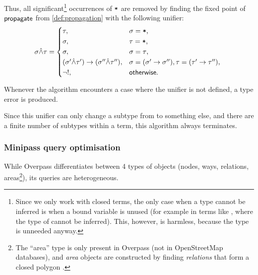 \documentclass[main.tex]{subfiles}
\begin{document}
Thus, all significant\footnote{
    Since we only work with closed terms, the only case when a type cannot be
    inferred is when a bound variable is unused (for example in terms like
    , where the type of  cannot be inferred).
    This, however, is harmless, because the type is unneeded anyway.
} occurrences of $\mbox{\texttt{*}}$ are removed by finding the fixed point of
$\mathsf{propagate}$ from \cref{def:propagation}
with the following unifier:
\[
    \sigma \unify \tau =
    \begin{cases*}
        \tau ,& $\sigma = \text{\code{*}}$, \\
        \sigma ,& $\tau = \text{\code{*}}$, \\
        \sigma ,& $\sigma = \tau$, \\
        (\sigma' \unify \tau') \tot (\sigma'' \unify \tau''), &
            $\sigma = (\sigma' \tot \sigma''), \tau = (\tau' \tot \tau'')$, \\
        \lnot ! ,& $\mathsf{otherwise}$. \\
    \end{cases*}
\]

Whenever the algorithm encounters a case where the unifier is not defined,
a type error is produced.

Since this unifier can only change a subtype from \code{*} to something else,
and there are a finite number of subtypes within a term, this algorithm
always terminates.

\subsubsection{Minipass query optimisation}
\label{sec:optimisation}
While Overpass differentiates between 4 types of objects (nodes, ways, relations,
areas\footnote{
    The ``area'' type is only present in Overpass (not in OpenStreetMap
    databases), and \emph{area} objects are constructed by finding \emph{relations}
    that form a closed polygon \cite{overpass}.
}), its queries are heterogeneous.
\end{document}
